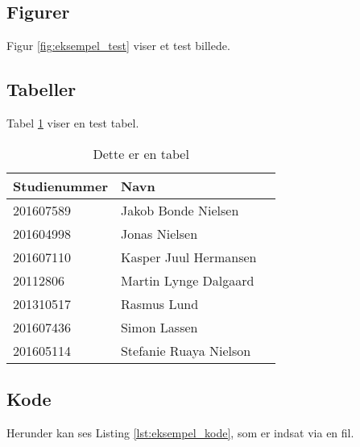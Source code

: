 \newpage
\subsection{Figurer}
Figur \ref{fig:eksempel_test} viser et test billede.

\subsection{Tabeller}
Tabel \ref{table:eksempel_tabel} viser en test tabel.
\begin{table}[H]
	\centering
	\caption{Dette er en tabel}
	\begin{tabular}{|l|l|l|}
		\hline
		\rowcolor{gray!50}
		\textbf{Studienummer} & \textbf{Navn}\\ [5px]
		\hline
		201607589 & Jakob Bonde Nielsen\\
		\hline
		201604998 & Jonas Nielsen\\
		\hline
		201607110 & Kasper Juul Hermansen\\
		\hline
		20112806 & Martin Lynge Dalgaard\\
		\hline
		201310517 & Rasmus Lund\\
		\hline
		201607436 & Simon Lassen\\
		\hline
		201605114 & Stefanie Ruaya Nielson\\
		\hline
		\end{tabular}
	\label{table:eksempel_tabel}
\end{table}

\newpage
\subsection{Kode}
Herunder kan ses Listing \ref{lst:eksempel_kode}, som er indsat via en fil.


